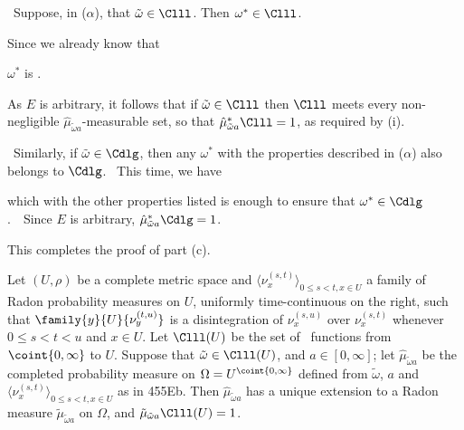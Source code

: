 {\medskip

\quad\grheadb\ Suppose, in ($\alpha$), that $\tilde\omega\in\Clll$.
Then $\omega^*\in\Clll$.   \Prf\





\noindent Since we already know that



\noindent $\omega^*$ is \callal.\ \Qed

As $E$ is arbitrary,
it follows that if $\tilde\omega\in\Clll$ then $\Clll$ meets every
non-negligible
$\hat\mu_{\tilde\omega a}$-measurable set, so that
$\hat\mu_{\tilde\omega a}^*\Clll=1$, as required by (i).

\medskip

\quad\grheadc\ Similarly, if $\tilde\omega\in\Cdlg$, then any $\omega^*$
with the properties described in ($\alpha$) also belongs to $\Cdlg$.
\Prf\ This time, we have


\noindent which with the other properties listed is enough to ensure that
$\omega^*\in\Cdlg$.\ \QeD\  Since $E$ is arbitrary,
$\hat\mu_{\tilde\omega a}^*\Cdlg=1$.

This completes the proof of part (c).
}%

 Let $(U,\rho)$ be a complete metric
space and $\langle\nu^{(s,t)}_x\rangle_{0\le s<t,x\in U}$ a family of
Radon probability measures on $U$, uniformly time-continuous on the right,
such that $\family{y}{U}{\nu_y^{(t,u)}}$ is a disintegration of
$\nu_x^{(s,u)}$ over $\nu_x^{(s,t)}$
whenever $0\le s<t<u$ and $x\in U$.   Let $\Clll(U)$ be the set of
\callal\ functions from
$\coint{0,\infty}$ to $U$.   Suppose that $\tilde\omega\in\Clll(U)$, and
$a\in[0,\infty]$;  let $\hat\mu_{\tilde\omega a}$ be the completed
probability measure on
$\Omega=U^{\coint{0,\infty}}$ defined from
$\tilde\omega$, $a$ and $\langle\nu^{(s,t)}_x\rangle_{0\le s<t,x\in U}$ as in
455Eb.   Then $\hat\mu_{\tilde\omega a}$ has a unique
extension to a Radon measure $\tilde\mu_{\tilde\omega a}$ on $\Omega$, and
$\tilde\mu_{\tilde\omega a}\Clll(U)=1$.

